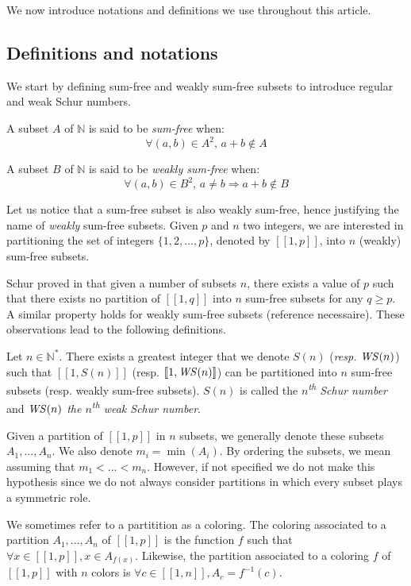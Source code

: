 \par
We now introduce notations and definitions we use throughout this article.

\subsection{Definitions and notations}

We start by defining sum-free and weakly sum-free subsets to introduce regular and weak Schur numbers.

\begin{definition}
A subset \(A\) of \(\mathbb{N}\) is said to be \textit{sum-free} when:
\[ \forall (a,b) \in A^2 \text{, } a+b \notin A\]
\end{definition}

\begin{definition}
A subset \(B\) of \(\mathbb{N}\) is said to be \textit{weakly sum-free} when:
\[ \forall (a,b) \in B^2 \text{, } a \neq b \Longrightarrow a+b \notin B\]
\end{definition}

Let us notice that a sum-free subset is also weakly sum-free, hence justifying the name of \textit{weakly} sum-free
subsets. Given \(p\) and \(n\) two integers, we are interested in partitioning the set of integers \(\{1, 2, ..., p\}\), 
denoted by \([\![1,p]\!]\), into \(n\) (weakly) sum-free subsets.

\par
Schur proved in \cite{Schur1917} that given a number of subsets \(n\), there exists a value of \(p\)
such that there exists no partition of \([\![1,q]\!]\) into \(n\) sum-free subsets for any \(q \geqslant p\). A similar
property holds for weakly sum-free subsets (reference necessaire). These observations lead to the following definitions.

\begin{definition}
Let \(n \in \mathbb{N}^*\). There exists a greatest integer that we denote \(S(n)\) (\textit{resp. \(\mathit{WS} (n)\)}) such that
\([\![1,S(n)]\!]\) (resp. \([\![1, \mathit{WS} (n)]\!]\)) can be partitioned into \(n\) sum-free subsets (resp. weakly sum-free
subsets). \(S(n)\) is called the \textit{\(n\)\textsuperscript{th} Schur number} and \textit{\(\mathit{WS} (n)\) the
\(n\)\textsuperscript{th} weak
Schur number}.
\end{definition}

Given a partition of \([\![1, p]\!]\) in \(n\) subsets, we generally denote these subsets \(A_1, ..., A_n\). We also denote
\(m_i = \min(A_i)\). By ordering the subsets, we mean assuming that \(m_1 < ... < m_n\). However, if not specified we do 
not make this hypothesis since we do not always consider partitions in which every subset plays a symmetric role.

\begin{definition}
We sometimes refer to a partitition as a coloring. The coloring associated to a partition \(A_1, ..., A_n\) of
\([\![1, p]\!]\) is the function \(f\) such that \(\forall x \in [\![1, p]\!], x \in A_{f(x)}\). Likewise, the partition associated to
a coloring \(f\) of \([\![1, p]\!]\) with \(n\) colors is \(\forall c \in [\![1, n]\!], A_c = f^{-1}(c)\).
\end{definition}
